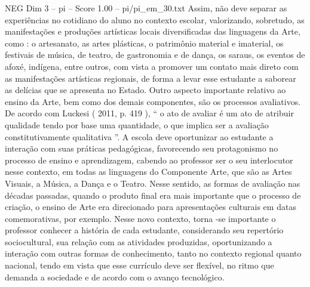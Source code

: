 \begin{textsample}{NEG Dim 3 – pi – Score 1.00 – pi/pi\_em\_30.txt}
Assim, não deve separar as experiências no cotidiano do aluno no contexto escolar, valorizando, sobretudo, as manifestações e produções artísticas locais diversificadas das linguagens da Arte, como : o artesanato, as artes plásticas, o patrimônio material e imaterial, os festivais de música, de teatro, de gastronomia e de dança, os saraus, os eventos de afoxé, indígena, entre outros, com vista a promover um contato mais direto com as manifestações artísticas regionais, de forma a levar esse estudante a saborear as delícias que se apresenta no Estado.
Outro aspecto importante relativo ao ensino da Arte, bem como dos demais componentes, são os processos avaliativos.
De acordo com Luckesi ( 2011, p. 419 ), “ o ato de avaliar é um ato de atribuir qualidade tendo por base uma quantidade, o que implica ser a avaliação constitutivamente qualitativa ”.
A escola deve oportunizar ao estudante a interação com suas práticas pedagógicas, favorecendo seu protagonismo no processo de ensino e aprendizagem, cabendo ao professor ser o seu interlocutor nesse contexto, em todas as linguagens do Componente Arte, que são as Artes Visuais, a Música, a Dança e o Teatro.
Nesse sentido, as formas de avaliação nas décadas passadas, quando o produto final era mais importante que o processo de criação, o ensino de Arte era direcionado para apresentações culturais em datas comemorativas, por exemplo.
Nesse novo contexto, torna -se importante o professor conhecer a história de cada estudante, considerando seu repertório sociocultural, sua relação com as atividades produzidas, oportunizando a interação com outras formas de conhecimento, tanto no contexto regional quanto nacional, tendo em vista que esse currículo deve ser flexível, no ritmo que demanda a sociedade e de acordo com o avanço tecnológico.

\end{textsample}
